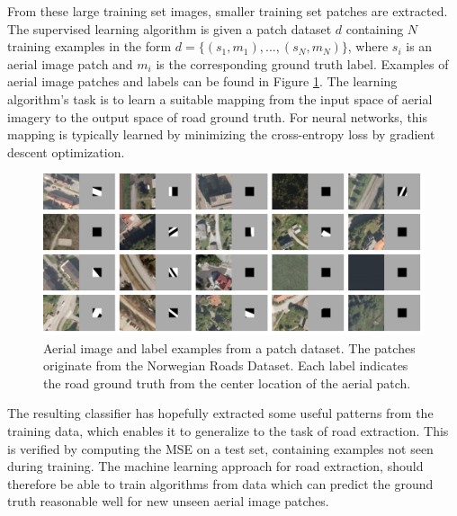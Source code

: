 From these large training set images, smaller training set patches are extracted. The supervised learning algorithm is given a patch dataset $d$ containing $N$ training examples in the form $d=\{(s_1, m_1),...,(s_N, m_N)\}$, where $s_i$ is an aerial image patch and $m_i$ is the corresponding ground truth label. Examples of aerial image patches and labels can be found in Figure \ref{fig:examples_background}. The learning algorithm's task is to learn a suitable mapping from the input space of aerial imagery to the output space of road ground truth. For neural networks, this mapping is typically learned by minimizing the cross-entropy loss by gradient descent optimization.\\

\begin{figure}
\begin{center}
\includegraphics[width=1\columnwidth]{figs/examples.png}
\caption[Patch dataset examples]{Aerial image and label examples from a patch dataset. The patches originate from the Norwegian Roads Dataset. Each label indicates the road ground truth from the center location of the aerial patch.}
\label{fig:examples_background}
\end{center}
\end{figure}

 The resulting classifier has hopefully extracted some useful patterns from the training data, which enables it to generalize to the task of road extraction. This is verified by computing the \ac{MSE} on a test set, containing examples not seen during training. The machine learning approach for road extraction, should therefore be able to train algorithms from data which can predict the ground truth reasonable well for new unseen aerial image patches. \\

